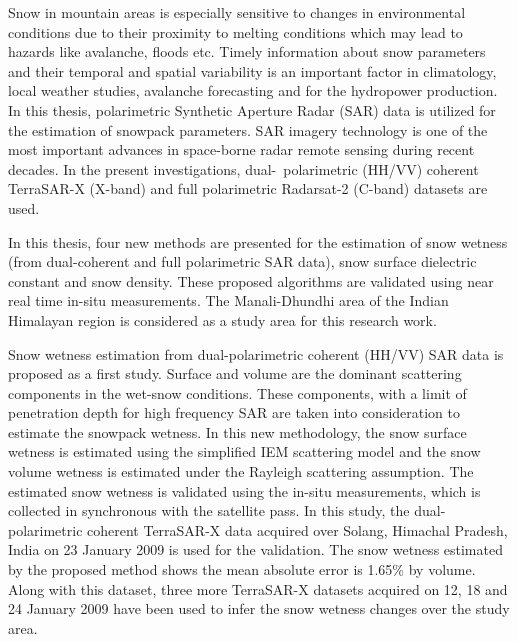 
Snow in mountain areas is especially sensitive to changes in environmental conditions due to their proximity to melting conditions which may lead to hazards like avalanche, floods etc.  Timely information about snow parameters and their temporal and spatial variability is an important factor in climatology, local weather studies, avalanche forecasting and for the hydropower production. In this thesis, polarimetric Synthetic Aperture Radar (SAR) data is utilized for the estimation of snowpack parameters. SAR imagery technology is one of the most important advances in space-borne radar remote sensing during recent decades. In the present investigations, dual-~polarimetric (HH/VV) coherent TerraSAR-X (X-band) and full polarimetric Radarsat-2 (C-band) datasets are used.

In this thesis, four new methods are presented for the estimation of snow wetness (from dual-coherent and full polarimetric SAR data), snow surface dielectric constant and snow density. These proposed algorithms are validated using near real time in-situ measurements. The Manali-Dhundhi area of the Indian Himalayan region is considered as a study area for this research work. 

Snow wetness estimation from dual-polarimetric coherent (HH/VV) SAR data is proposed as a first study. Surface and volume are the dominant scattering components in the wet-snow conditions. These components, with a limit of penetration depth for high frequency SAR are taken into consideration to estimate the snowpack wetness. In this new methodology, the snow surface wetness is estimated using the simplified IEM scattering model and the snow volume wetness is estimated under the Rayleigh scattering assumption. The estimated snow wetness is validated using the in-situ measurements, which is collected in synchronous with the satellite pass. In this study, the dual-polarimetric coherent TerraSAR-X data acquired over Solang, Himachal Pradesh, India on 23 January 2009 is used for the validation. The snow wetness estimated by the proposed method shows the mean absolute error is 1.65$\%$ by volume. Along with this dataset, three more TerraSAR-X datasets acquired on 12, 18 and 24 January 2009 have been used to infer the snow wetness changes over the study area. 

